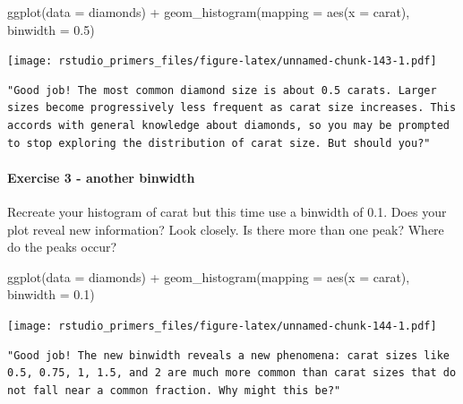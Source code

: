 \documentclass[
]{article}
\newenvironment{Shaded}{\begin{snugshade}}{\end{snugshade}}
\newcommand{\AttributeTok}[1]{\textcolor[rgb]{0.77,0.63,0.00}{#1}}
\newcommand{\FloatTok}[1]{\textcolor[rgb]{0.00,0.00,0.81}{#1}}
\newcommand{\FunctionTok}[1]{\textcolor[rgb]{0.00,0.00,0.00}{#1}}
\newcommand{\NormalTok}[1]{#1}
\newcommand{\SpecialCharTok}[1]{\textcolor[rgb]{0.00,0.00,0.00}{#1}}
\begin{document}
\begin{Shaded}
\begin{Highlighting}[]
\FunctionTok{ggplot}\NormalTok{(}\AttributeTok{data =}\NormalTok{ diamonds) }\SpecialCharTok{+}
  \FunctionTok{geom\_histogram}\NormalTok{(}\AttributeTok{mapping =} \FunctionTok{aes}\NormalTok{(}\AttributeTok{x =}\NormalTok{ carat), }\AttributeTok{binwidth =} \FloatTok{0.5}\NormalTok{)}
\end{Highlighting}
\end{Shaded}

\texttt{[image: rstudio\_primers\_files/figure-latex/unnamed-chunk-143-1.pdf]}

\begin{verbatim}
"Good job! The most common diamond size is about 0.5 carats. Larger sizes become progressively less frequent as carat size increases. This accords with general knowledge about diamonds, so you may be prompted to stop exploring the distribution of carat size. But should you?"
\end{verbatim}

\hypertarget{exercise-3---another-binwidth}{%
\paragraph{Exercise 3 - another
binwidth}\label{exercise-3---another-binwidth}}

Recreate your histogram of carat but this time use a binwidth of 0.1.
Does your plot reveal new information? Look closely. Is there more than
one peak? Where do the peaks occur?

\begin{Shaded}
\begin{Highlighting}[]
\FunctionTok{ggplot}\NormalTok{(}\AttributeTok{data =}\NormalTok{ diamonds) }\SpecialCharTok{+}
  \FunctionTok{geom\_histogram}\NormalTok{(}\AttributeTok{mapping =} \FunctionTok{aes}\NormalTok{(}\AttributeTok{x =}\NormalTok{ carat), }\AttributeTok{binwidth =} \FloatTok{0.1}\NormalTok{)}
\end{Highlighting}
\end{Shaded}

\texttt{[image: rstudio\_primers\_files/figure-latex/unnamed-chunk-144-1.pdf]}

\begin{verbatim}
"Good job! The new binwidth reveals a new phenomena: carat sizes like 0.5, 0.75, 1, 1.5, and 2 are much more common than carat sizes that do not fall near a common fraction. Why might this be?"
\end{verbatim}
\end{document}

